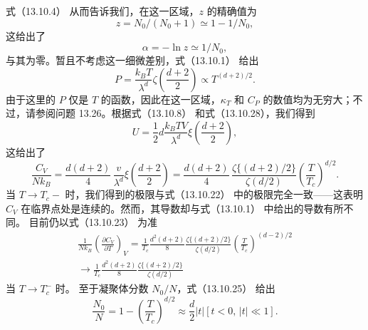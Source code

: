 式（13.10.4） 从而告诉我们，在这一区域，\(z\) 的精确值为
\begin{equation}\tag{13.6.34}\label{eq:13.6.34}
z = N _ { 0 } / ( N _ { 0 } + 1 ) \simeq 1 - 1 / N _ { 0 } ,
\end{equation}
这给出了
\begin{equation}\tag{13.6.35}\label{eq:13.6.35}
\alpha = - \ln z \simeq 1 / N _ { 0 } ,
\end{equation}
与其为零。暂且不考虑这一细微差别，式（13.10.1） 给出
\begin{equation}\tag{13.6.36}\label{eq:13.6.36}
P = \frac { k _ { B } T } { \lambda ^{d} } \zeta \left( \frac { d + 2 } { 2 } \right) \propto T ^{( d + 2 ) / 2} .
\end{equation}
由于这里的 \(P\) 仅是 \(T\) 的函数，因此在这一区域，\(\kappa_T\) 和 \(C_P\) 的数值均为无穷大；不过，请参阅问题 13.26。根据式（13.10.8） 和式（13.10.28），我们得到
\begin{equation}\tag{13.6.37}\label{eq:13.6.37}
U = \frac { 1 } { 2 } d \frac { k _ { B } T V } { \lambda ^{d} } \xi \left( \frac { d + 2 } { 2 } \right) ,
\end{equation}
这给出了
\begin{equation}\tag{13.6.38}\label{eq:13.6.38}
\frac { C _ { V } } { N k _ { B } } = \frac { d ( d + 2 ) } { 4 } \, \frac { v } { \lambda ^{d} } \xi \left( \frac { d + 2 } { 2 } \right) = \frac { d ( d + 2 ) } { 4 } \, \frac { \zeta \{ ( d + 2 ) / 2 \} } { \zeta ( d / 2 ) } \left( \frac { T } { T _ { c } } \right) ^{d / 2} .
\end{equation}
当 \(T \rightarrow T_{c}-\) 时，我们得到的极限与式（13.10.22） 中的极限完全一致——这表明 \(C_{V}\) 在临界点处是连续的。然而，其导数却与式（13.10.1） 中给出的导数有所不同。
目前仍以式（13.10.23） 为准
\begin{equation}\tag{13.6.39}\label{eq:13.6.39}
\begin{array}{r} { \frac { 1 } { N k _ { B } } \left( \frac { \partial C _ { V } } { \partial T } \right) _ { V } = \frac { 1 } { T _ { c } } \frac { d ^{2} ( d + 2 ) } { 8 } \frac { \zeta \{ ( d + 2 ) / 2 \} } { \zeta ( d / 2 ) } \left( \frac { T } { T _ { c } } \right) ^{( d - 2 ) / 2} } \\{ \rightarrow \frac { 1 } { T _ { c } } \frac { d ^{2} ( d + 2 ) } { 8 } \frac { \zeta \{ ( d + 2 ) / 2 \} } { \zeta ( d / 2 ) } } \end{array}
\end{equation}
当 \(T \rightarrow T_{c}^{-}\) 时。
至于凝聚体分数 \(N_{0}/N\)，式（13.10.25） 给出
\begin{equation}\tag{13.6.40}\label{eq:13.6.40}
\frac { N _ { 0 } } { N } = 1 - \left( \frac { T } { T _ { c } } \right) ^{d / 2} \approx \frac { d } { 2 } | t |  [ t < 0 , \, | t | \ll 1 ] .
\end{equation}
